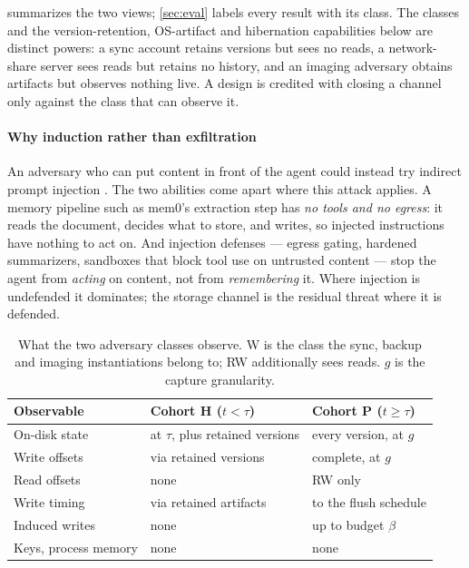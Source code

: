  summarizes the two views; \cref{sec:eval} labels every result with its class. The
classes and the version-retention, OS-artifact and hibernation capabilities below are distinct
powers: a sync account retains versions but sees no reads, a network-share server sees reads but
retains no history, and an imaging adversary obtains artifacts but observes nothing live. A design
is credited with closing a channel only against the class that can observe it.

\paragraph{Why induction rather than exfiltration}
An adversary who can put content in front of the agent could instead try indirect prompt injection
\cite{greshake2023injection}. The two abilities come apart where this attack applies. A memory
pipeline such as mem0's extraction step has \emph{no tools and no egress}: it reads the document,
decides what to store, and writes, so injected instructions have nothing to act on. And injection
defenses --- egress gating, hardened summarizers, sandboxes that block tool use on untrusted content
\cite{debenedetti2025defeating} --- stop the agent from \emph{acting} on content, not from
\emph{remembering} it. Where injection is undefended it dominates; the storage channel is the
residual threat where it is defended.

\begin{table}[t]
\centering
\caption{What the two adversary classes observe. W is the class the sync, backup and imaging
instantiations belong to; RW additionally sees reads. $g$ is the capture granularity.}
\label{tab:tau}
\footnotesize
\begin{tabular}{@{}p{}p{}p{}@{}}
\toprule
Observable & Cohort H ($t<\tau$) & Cohort P ($t\ge\tau$) \\
\midrule
On-disk state & at $\tau$, plus retained versions & every version, at $g$ \\
Write offsets & via retained versions & complete, at $g$ \\
Read offsets & none & RW only \\
Write timing & via retained artifacts & to the flush schedule \\
Induced writes & none & up to budget $\beta$ \\
Keys, process memory & none & none \\
\bottomrule
\end{tabular}
\end{table}

